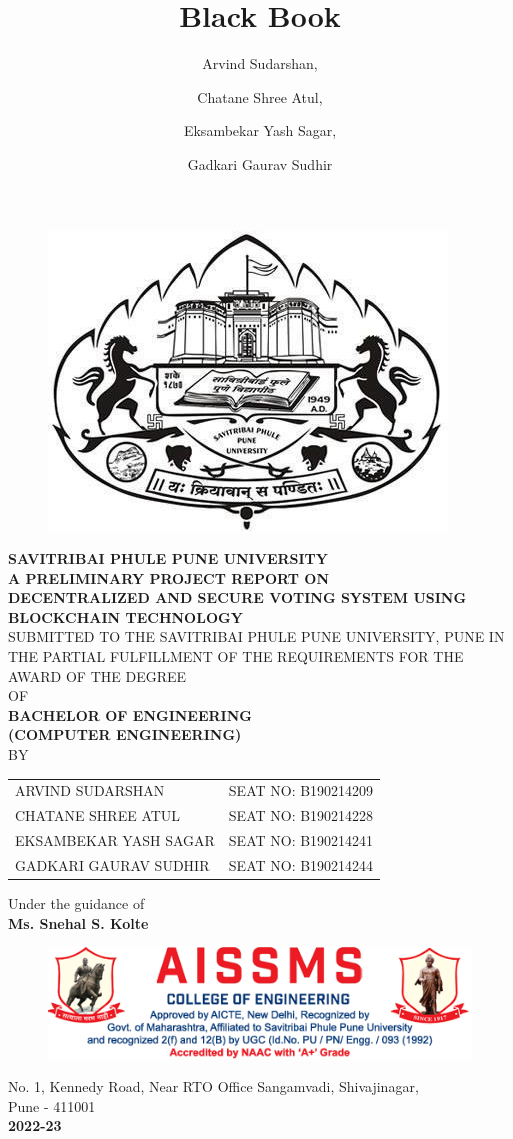 \documentclass[oneside, 12pt]{book}
\title{Black Book}
\author{
  Arvind Sudarshan,
  \and
  Chatane Shree Atul,
  \and
  Eksambekar Yash Sagar,
  \and
  Gadkari Gaurav Sudhir
}
\begin{document}
\frontmatter
\begin{titlepage}
	\centering
	\begin{figure}[H]
		\centering
		\includegraphics[width=0.4\linewidth]{./Resources/sppu.png}
	\end{figure}
	\textbf{SAVITRIBAI PHULE PUNE UNIVERSITY}\break
	\\\textbf{A PRELIMINARY PROJECT REPORT ON}\break
	\\{\large\textbf{DECENTRALIZED AND SECURE VOTING SYSTEM USING BLOCKCHAIN TECHNOLOGY}}\break
	\\SUBMITTED TO THE SAVITRIBAI PHULE PUNE UNIVERSITY, PUNE IN THE PARTIAL FULFILLMENT OF THE REQUIREMENTS FOR THE AWARD OF THE DEGREE\break
	\\OF\break
	\\{\large\textbf{BACHELOR OF ENGINEERING\\(COMPUTER ENGINEERING)}}\break
	\\BY\break
	\begin{table}[H]
		\centering
		\begin{tabular}{lr}
			ARVIND SUDARSHAN      & SEAT NO: B190214209 \\
			CHATANE SHREE ATUL    & SEAT NO: B190214228 \\
			EKSAMBEKAR YASH SAGAR & SEAT NO: B190214241 \\
			GADKARI GAURAV SUDHIR & SEAT NO: B190214244
		\end{tabular}
	\end{table}
	Under the guidance of\break
	\\\textbf{Ms. Snehal S. Kolte}\break
	\begin{figure}[H]
		\centering
		\includegraphics[width=\linewidth]{./Resources/letterhead2.png}
	\end{figure}
	No. 1, Kennedy Road, Near RTO Office Sangamvadi, Shivajinagar,\\Pune - 411001\break
	\\\textbf{\large 2022-23}\\
	\restoregeometry
\end{titlepage}
\end{document}
